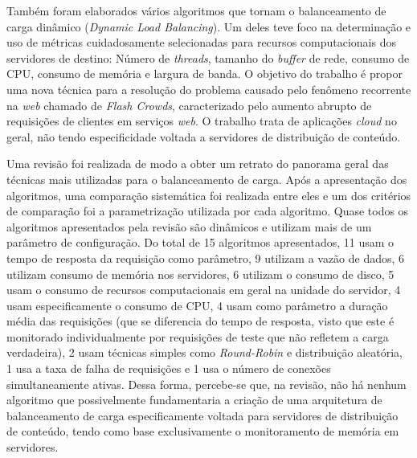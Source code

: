 Também foram elaborados vários algoritmos que tornam o balanceamento de carga dinâmico (\textit{Dynamic Load Balancing}). Um deles \cite{novelWeightAssignmentLoadBalancingAlgorithmForCloudApps2023} teve foco na determinação e uso de métricas cuidadosamente selecionadas para recursos computacionais dos servidores de destino: Número de \textit{threads}, tamanho do \textit{buffer} de rede, consumo de CPU, consumo de memória e largura de banda. O objetivo do trabalho é propor uma nova técnica para a resolução do problema causado pelo fenômeno recorrente na \textit{web} chamado de \textit{Flash Crowds}, caracterizado pelo aumento abrupto de requisições de clientes em serviços \textit{web}. O trabalho trata de aplicações \textit{cloud} no geral, não tendo especificidade voltada a servidores de distribuição de conteúdo.

Uma revisão \cite{webServerPerformanceImprovement2021Review} foi realizada de modo a obter um retrato do panorama geral das técnicas mais utilizadas para o balanceamento de carga. Após a apresentação dos algoritmos, uma comparação sistemática foi realizada entre eles e um dos critérios de comparação foi a parametrização utilizada por cada algoritmo. Quase todos os algoritmos apresentados pela revisão são dinâmicos e utilizam mais de um parâmetro de configuração. Do total de 15 algoritmos apresentados, 11 usam o tempo de resposta da requisição como parâmetro, 9 utilizam a vazão de dados, 6 utilizam consumo de memória nos servidores, 6 utilizam o consumo de disco, 5 usam o consumo de recursos computacionais em geral na unidade do servidor, 4 usam especificamente o consumo de CPU, 4 usam como parâmetro a duração média das requisições (que se diferencia do tempo de resposta, visto que este é monitorado individualmente por requisições de teste que não refletem a carga verdadeira), 2 usam técnicas simples como \textit{Round-Robin} e distribuição aleatória, 1 usa a taxa de falha de requisições e 1 usa o número de conexões simultaneamente ativas. Dessa forma, percebe-se que, na revisão, não há nenhum algoritmo que possivelmente fundamentaria a criação de uma arquitetura de balanceamento de carga especificamente voltada para servidores de distribuição de conteúdo, tendo como base exclusivamente o monitoramento de memória em servidores.

